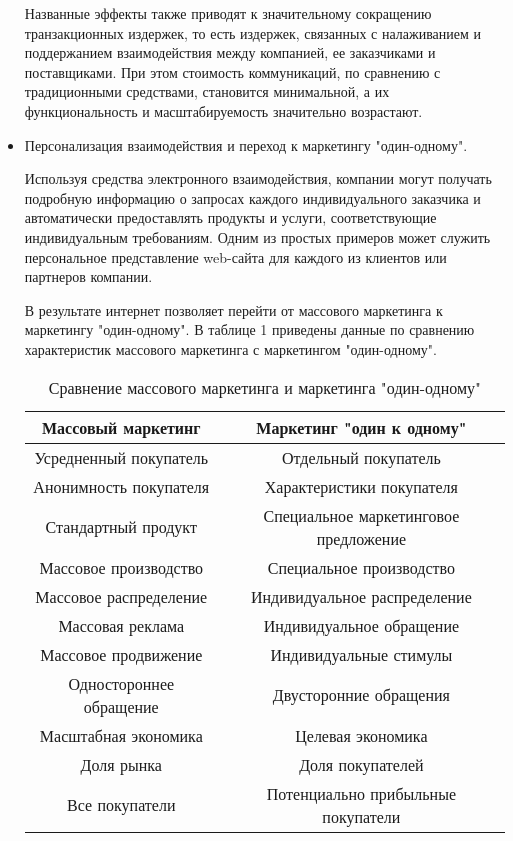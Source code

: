 \documentclass[a4paper,english,russian]{G2-105}
\begin{document}
\begin{itemize}
\par Названные эффекты также приводят к значительному сокращению транзакционных издержек, то есть издержек, связанных с налаживанием и поддержанием взаимодействия между компанией, ее заказчиками и поставщиками. При этом стоимость коммуникаций, по сравнению с традиционными средствами, становится минимальной, а их функциональность и масштабируемость значительно возрастают.
\item Персонализация взаимодействия и переход к маркетингу "один-одному".
\par Используя средства электронного взаимодействия, компании могут получать подробную информацию о запросах каждого индивидуального заказчика и автоматически предоставлять продукты и услуги, соответствующие индивидуальным требованиям. Одним из простых примеров может служить персональное представление web-сайта для каждого из клиентов или партнеров компании.
\par В результате интернет позволяет перейти от массового маркетинга к маркетингу "один-одному". В таблице 1 приведены данные по сравнению характеристик массового маркетинга с маркетингом "один-одному".
\begin{longtable}{|c|c|}
    \caption{Сравнение массового маркетинга и маркетинга "один-одному"}\\ \hline
    \label{am} 
    Массовый маркетинг & Маркетинг "один к одному" \\ \hline \endhead
    Усредненный покупатель & Отдельный покупатель \\ \hline
    Анонимность покупателя & Характеристики покупателя \\ \hline
    Стандартный продукт & Специальное маркетинговое предложение \\ \hline
    Массовое производство & Специальное производство \\ \hline
    Массовое распределение & Индивидуальное распределение \\ \hline
    Массовая реклама & Индивидуальное обращение \\ \hline
    Массовое продвижение & Индивидуальные стимулы \\ \hline
    Одностороннее обращение & Двусторонние обращения \\ \hline
    Масштабная экономика & Целевая экономика \\ \hline
    Доля рынка & Доля покупателей \\ \hline
    Все покупатели & Потенциально прибыльные покупатели \\ \hline

\end{longtable}
\end{itemize}
\end{document}
